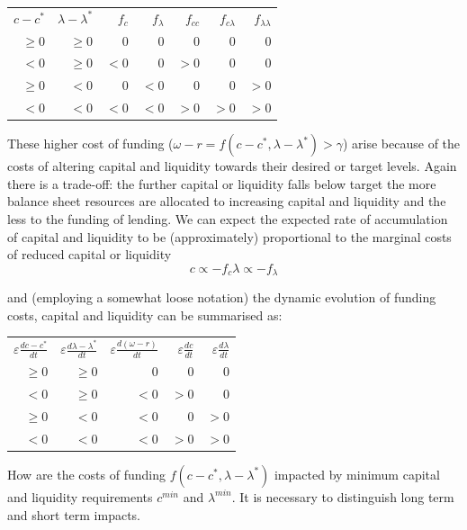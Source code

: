\documentclass[
  12,
]{article}
\begin{document}
\begin{center}
\begin{tabular}{ r r r r r r r}
$c-c^\ast$&$\lambda-\lambda^\ast$&$f_c$&$f_\lambda$&$f_{cc}$&$f_{c\lambda}$&$f_{\lambda\lambda}$\\
$\geq 0$&$\geq 0$&$0$&$0$&$0$&$0$&$0$\\
$<0$&$\geq 0$&$<0$&$0$&$>0$&$0$&$0$\\
$\geq 0$&$<0$&$0$&$<0$&$0$&$0$&$>0$\\
$<0$&$<0$&$<0$&$<0$&$>0$&$>0$&$>0$
\end{tabular}
\end{center}

These higher cost of funding (\(\omega - r = f(c-c^\ast,\lambda-\lambda^\ast )>\gamma\)) arise because of the costs of altering capital and liquidity towards their desired or target levels. Again there is a trade-off: the further capital or liquidity falls below target the more balance sheet resources are allocated to increasing capital and liquidity and the less to the funding of lending. We can expect the expected rate of accumulation of capital and liquidity to be (approximately) proportional to the marginal costs of reduced capital or liquidity
\[
c \propto -f_c
\lambda \propto -f_\lambda
\]

and (employing a somewhat loose notation) the dynamic evolution of funding costs, capital and liquidity can be summarised as:

\begin{center}
\begin{tabular}{ r r r r r}
$\varepsilon\frac{{d}c-c^\ast}{{d}t}$&
$\varepsilon\frac{{d}\lambda-\lambda^\ast}{{d}t}$&
$\varepsilon\frac{{d}(\omega- r)}{{d}t}$&
$\varepsilon\frac{{d}c}{{d}t}$&
$\varepsilon\frac{{d}\lambda}{{d}t} $\\
$\geq 0$&$\geq 0$&$0$&$0$&$0$\\
$<0$&$\geq 0$&$<0$&$>0$&$0$\\
$\geq 0$&$<0$&$<0$&$0$&$>0$\\
$<0$&$<0$&$<0$&$>0$&$>0$
\end{tabular}
\end{center}

How are the costs of funding \(f(c-c^\ast,\lambda-\lambda^\ast)\) impacted by minimum capital and liquidity requirements \(c^{min}\) and \(\lambda^{min}\). It is necessary to distinguish long term and short term impacts.
\end{document}
